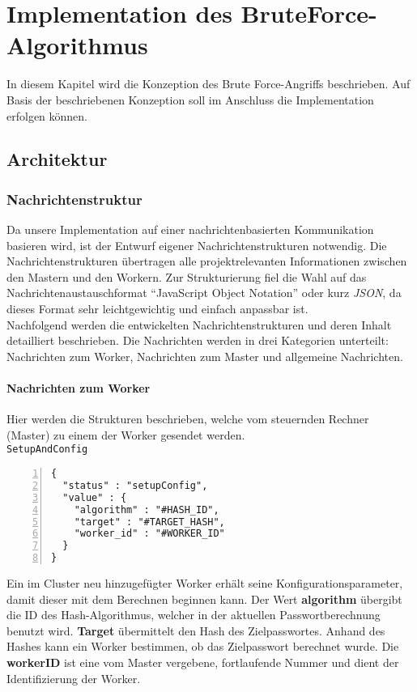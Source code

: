 \chapter{Implementation des BruteForce-Algorithmus}
\label{implementation}
In diesem Kapitel wird die Konzeption des Brute Force-Angriffs beschrieben. Auf Basis der beschriebenen Konzeption soll im Anschluss die Implementation erfolgen können. 



\section{Architektur}


\subsection{Nachrichtenstruktur}
Da unsere Implementation auf einer nachrichtenbasierten Kommunikation basieren wird, ist der Entwurf eigener Nachrichtenstrukturen notwendig. Die Nachrichtenstrukturen übertragen alle projektrelevanten Informationen zwischen den Mastern und den Workern. Zur Strukturierung fiel die Wahl auf das Nachrichtenaustauschformat \enquote{JavaScript Object Notation} oder kurz \emph{JSON}, da dieses Format sehr leichtgewichtig und einfach anpassbar ist. \\
Nachfolgend werden die entwickelten Nachrichtenstrukturen und deren Inhalt detailliert beschrieben. Die Nachrichten werden in drei Kategorien unterteilt: Nachrichten zum Worker, Nachrichten zum Master und allgemeine Nachrichten.

\subsubsection{Nachrichten zum Worker}
Hier werden die Strukturen beschrieben, welche vom steuernden Rechner (Master) zu einem der Worker gesendet werden.\\

\texttt{SetupAndConfig}
\begin{lstlisting}[basicstyle=\ttfamily,numbers=left,numberstyle=\footnotesize\ttfamily,backgroundcolor=\color{sourcegray}]
{
  "status" : "setupConfig",
  "value" : {
    "algorithm" : "#HASH_ID",
    "target" : "#TARGET_HASH", 
    "worker_id" : "#WORKER_ID"
  }
}
\end{lstlisting}
Ein im Cluster neu hinzugefügter Worker erhält seine Konfigurationsparameter, damit dieser mit dem Berechnen beginnen kann. 
Der Wert \textbf{algorithm} übergibt die ID des Hash-Algorithmus, welcher in der aktuellen Passwortberechnung benutzt wird. \textbf{Target} übermittelt den Hash des Zielpasswortes. Anhand des Hashes kann ein Worker bestimmen, ob das Zielpasswort berechnet wurde. Die \textbf{workerID} ist eine vom Master vergebene, fortlaufende Nummer und dient der Identifizierung der Worker.\\

